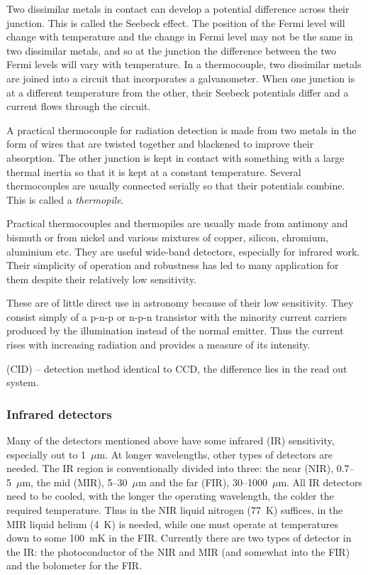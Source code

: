 \documentclass{article}
\begin{document}
 Two dissimilar metals in contact can
develop a potential difference across their junction. This is called
the Seebeck effect. The position of the Fermi level will change with
temperature and the change in Fermi level may not be the same in two
dissimilar metals, and so at the junction the difference between the
two Fermi levels will vary with temperature. In a thermocouple, two
dissimilar metals are joined into a circuit that incorporates a
galvanometer. When one junction is at a different temperature from the
other, their Seebeck potentials differ and a current flows through the
circuit. 

A practical thermocouple for radiation detection is made from two
metals in the form of wires that are twisted together and blackened to
improve their absorption. The other junction is kept in contact with
something with a large thermal inertia so that it is kept at a
constant temperature. Several thermocouples are usually connected
serially so that their potentials combine. This is called a {\it
  thermopile}.

Practical thermocouples and thermopiles are usually made from antimony
and bismuth or from nickel and various mixtures of copper, silicon,
chromium, aluminium etc. They are useful wide-band detectors,
especially for infrared work. Their simplicity of operation and
robustness has led to many application for them despite their
relatively low sensitivity.

 These are of little direct use in
astronomy because of their low sensitivity. They consist simply of a
p-n-p or n-p-n transistor with the minority current carriers produced
by the illumination instead of the normal emitter. Thus the current
rises with increasing radiation and provides a measure of its intensity.

 (CID) -- detection method identical to CCD, 
the difference lies in the read out system. 

\subsubsection*{Infrared detectors}

Many of the detectors mentioned above have some infrared (IR) sensitivity, 
especially out to 1~$\mu$m. At longer wavelengths, other types of detectors
are needed. The IR region is conventionally divided into three: the near
(NIR), 0.7--5~$\mu$m, the mid (MIR), 5--30~$\mu$m and the far (FIR), 
30--1000~$\mu$m. All IR detectors need to be cooled, with the longer the
operating wavelength, the colder the required temperature. Thus in the 
NIR liquid nitrogen (77~K) suffices, in the MIR liquid helium (4~K) is 
needed, while one must operate at temperatures down to some 100~mK in the 
FIR. Currently there are two types of detector in the IR: the photoconductor
of the NIR and MIR (and somewhat into the FIR) and the bolometer for the
FIR.
\end{document}
